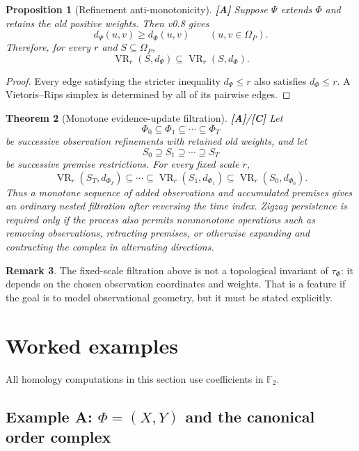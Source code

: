 \documentclass[11pt]{article}
\newtheorem{theorem}{Theorem}[section]
\newtheorem{proposition}[theorem]{Proposition}
\theoremstyle{definition}
\newtheorem{remark}[theorem]{Remark}
\newcommand{\F}{\mathbb F_2}
\newcommand{\Om}{\Omega_P}
\newcommand{\VR}{\operatorname{VR}}
\newcommand{\statusA}{\textbf{[A]}}
\newcommand{\statusC}{\textbf{[C]}}
\begin{document}
\begin{proposition}[Refinement anti-monotonicity]\label{prop:ripsref}
\statusA\;
Suppose $\Psi$ extends $\Phi$ and retains the old positive weights. Then v0.8 gives
\[
d_\Psi(u,v)\ge d_\Phi(u,v)
\qquad(u,v\in\Om).
\]
Therefore, for every $r$ and $S\subseteq\Om$,
\[
\VR_r(S,d_\Psi)\subseteq\VR_r(S,d_\Phi).
\]
\end{proposition}

\begin{proof}
Every edge satisfying the stricter inequality $d_\Psi\le r$ also satisfies $d_\Phi\le r$. A Vietoris--Rips simplex is determined by all of its pairwise edges.
\end{proof}

\begin{theorem}[Monotone evidence-update filtration]\label{thm:filtration}
\statusA/\statusC\;
Let
\[
\Phi_0\subseteq\Phi_1\subseteq\cdots\subseteq\Phi_T
\]
be successive observation refinements with retained old weights, and let
\[
S_0\supseteq S_1\supseteq\cdots\supseteq S_T
\]
be successive premise restrictions. For every fixed scale $r$,
\[
\VR_r(S_T,d_{\Phi_T})
\subseteq\cdots\subseteq
\VR_r(S_1,d_{\Phi_1})
\subseteq
\VR_r(S_0,d_{\Phi_0}).
\]
Thus a monotone sequence of added observations and accumulated premises gives an ordinary nested filtration after reversing the time index. Zigzag persistence is required only if the process also permits nonmonotone operations such as removing observations, retracting premises, or otherwise expanding and contracting the complex in alternating directions.
\end{theorem}

\begin{remark}
The fixed-scale filtration above is not a topological invariant of $\tau_\Phi$: it depends on the chosen observation coordinates and weights. That is a feature if the goal is to model observational geometry, but it must be stated explicitly.
\end{remark}

\section{Worked examples}

All homology computations in this section use coefficients in $\F$.

\subsection{Example A: $\Phi=(X,Y)$ and the canonical order complex}
\end{document}
